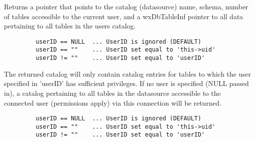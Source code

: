 
\label{wxdbgetcatalog}


Returns a  pointer that points to the catalog
(datasource) name, schema, number of tables accessible to the current user,
and a wxDbTableInf pointer to all data pertaining to all tables in the users
catalog.



\begin{verbatim}
         userID == NULL  ... UserID is ignored (DEFAULT)
         userID == ""    ... UserID set equal to 'this->uid'
         userID != ""    ... UserID set equal to 'userID'
\end{verbatim}


The returned catalog will only contain catalog entries for tables to which the user specified in 'userID' has sufficient privileges.  If no user is specified (NULL passed in), a catalog pertaining to all tables in the datasource accessible to the connected user (permissions apply) via this connection will be returned.

\label{wxdbgetcolumncount}





\begin{verbatim}
         userID == NULL  ... UserID is ignored (DEFAULT)
         userID == ""    ... UserID set equal to 'this->uid'
         userID != ""    ... UserID set equal to 'userID'
\end{verbatim}

